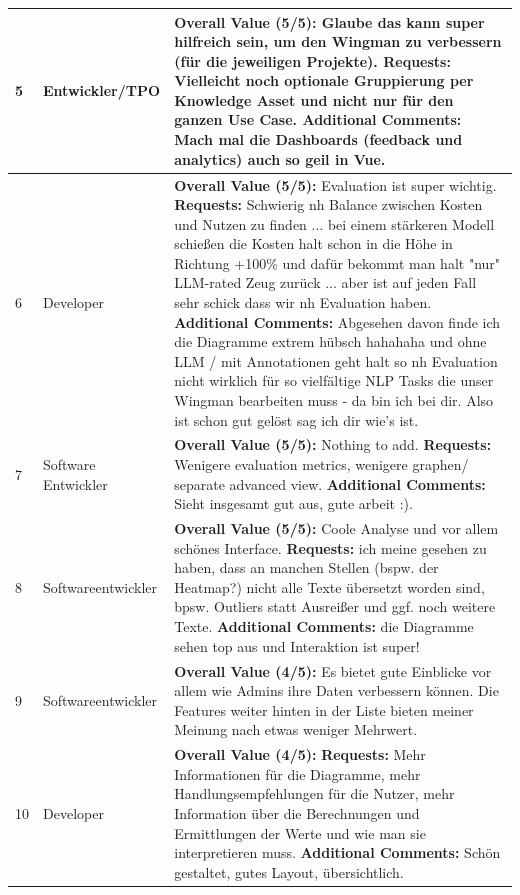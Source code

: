 \documentclass[
	english,
	ruledheaders=section,%
	class=report,%
	thesis={type=bachelor},%
	accentcolor=1b,%
	custommargins=true,%
	marginpar=false,%
	parskip=half-,%
	fontsize=11pt,%
	DIV=14,
]{tudapub}
\begin{document}
\begin{longtable}{l >{\RaggedRight}p{3cm} >{\RaggedRight}p{10cm}}
    \midrule
    5 & Entwickler/TPO & \textbf{Overall Value (5/5):} Glaube das kann super hilfreich sein, um den Wingman zu verbessern (für die jeweiligen Projekte). \textbf{Requests:} Vielleicht noch optionale Gruppierung per Knowledge Asset und nicht nur für den ganzen Use Case. \textbf{Additional Comments:} Mach mal die Dashboards (feedback und analytics) auch so geil in Vue. \\
    \midrule
    6 & Developer & \textbf{Overall Value (5/5):} Evaluation ist super wichtig. \textbf{Requests:} Schwierig nh Balance zwischen Kosten und Nutzen zu finden ... bei einem stärkeren Modell schießen die Kosten halt schon in die Höhe in Richtung +100\% und dafür bekommt man halt "nur" LLM-rated Zeug zurück ... aber ist auf jeden Fall sehr schick dass wir nh Evaluation haben. \textbf{Additional Comments:} Abgesehen davon finde ich die Diagramme extrem hübsch hahahaha und ohne LLM / mit Annotationen geht halt so nh Evaluation nicht wirklich für so vielfältige NLP Tasks die unser Wingman bearbeiten muss - da bin ich bei dir. Also ist schon gut gelöst sag ich dir wie's ist. \\
    \midrule
    7 & Software Entwickler & \textbf{Overall Value (5/5):} Nothing to add. \textbf{Requests:} Wenigere evaluation metrics, wenigere graphen/ separate advanced view. \textbf{Additional Comments:} Sieht insgesamt gut aus, gute arbeit :). \\
    \midrule
    8 & Softwareentwickler & \textbf{Overall Value (5/5):} Coole Analyse und vor allem schönes Interface. \textbf{Requests:} ich meine gesehen zu haben, dass an manchen Stellen (bspw. der Heatmap?) nicht alle Texte übersetzt worden sind, bpsw. Outliers statt Ausreißer und ggf. noch weitere Texte. \textbf{Additional Comments:} die Diagramme sehen top aus und Interaktion ist super! \\
    \midrule
    9 & Softwareentwickler & \textbf{Overall Value (4/5):} Es bietet gute Einblicke vor allem wie Admins ihre Daten verbessern können. Die Features weiter hinten in der Liste bieten meiner Meinung nach etwas weniger Mehrwert. \\
    \midrule
    10 & Developer & \textbf{Overall Value (4/5):} \textbf{Requests:} Mehr Informationen für die Diagramme, mehr Handlungsempfehlungen für die Nutzer, mehr Information über die Berechnungen und Ermittlungen der Werte und wie man sie interpretieren muss. \textbf{Additional Comments:} Schön gestaltet, gutes Layout, übersichtlich. \\
\end{longtable}
\end{document}
